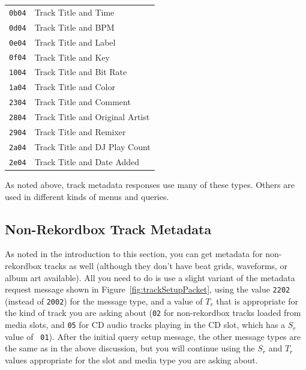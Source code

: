 \documentclass[11pt]{article}
\begin{document}
\begin{longtabu}{rl}
  {\tt 0b04} & Track Title and Time \\

  {\tt 0d04} & Track Title and BPM \\

  {\tt 0e04} & Track Title and Label \\

  {\tt 0f04} & Track Title and Key \\

  {\tt 1004} & Track Title and Bit Rate \\

  {\tt 1a04} & Track Title and Color \\

  {\tt 2304} & Track Title and Comment \\

  {\tt 2804} & Track Title and Original Artist \\

  {\tt 2904} & Track Title and Remixer \\

  {\tt 2a04} & Track Title and DJ Play Count \\

  {\tt 2e04} & Track Title and Date Added \\

\end{longtabu}

As noted above, track metadata responses use many of these types.
Others are used in different kinds of menus and queries.

\subsection{Non-Rekordbox Track Metadata}
\label{sec:nonRekordboxMetadata}

As noted in the introduction to this section, you can get metadata for
non-rekordbox tracks as well (although they don't have beat grids,
waveforms, or album art available). All you need to do is use a slight
variant of the metadata request message shown in
Figure~\ref{fig:trackSetupPacket}, using the value {\tt 2202} (instead
of {\tt 2002}) for the message type, and a value of $T_r$ that is
appropriate for the kind of track you are asking about ({\tt 02} for
non-rekordbox tracks loaded from media slots, and {\tt 05} for CD
audio tracks playing in the CD slot, which has a $S_r$ value of {\tt
  01}). After the initial query setup message, the other message types
are the same as in the above discussion, but you will continue using
the $S_r$ and $T_r$ values appropriate for the slot and media type you
are asking about.
\end{document}
